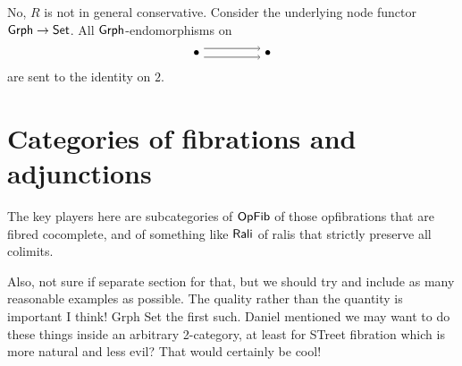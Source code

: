 \documentclass{amsart}
\begin{document}
\begin{ex}
  No, $ R $ is not in general conservative.
  Consider the underlying node functor
  $ \mathsf{Grph} \to \mathsf{Set} $.  All $ \mathsf{Grph} $-endomorphisms
  on
  \[
    \begin{tikzpicture}
      \node (a) at (0,0) {$ \bullet $};
      \node (b) at (2,0) {$ \bullet $};
      \draw [->] (a.30) to (b.150);
      \draw [->] (a.-30) to (b.-150);
    \end{tikzpicture}
  \]
  are sent to the identity on $ 2 $.
\end{ex}

\section{Categories of fibrations and adjunctions}

The key players here are subcategories of $\mathsf{OpFib}$ of those opfibrations that are fibred cocomplete, and of something like
$\mathsf{Rali}$ of ralis that strictly preserve all colimits.

{\chris Also, not sure if separate section for that, but we should try and include as many reasonable examples as possible. The quality rather
than the quantity is important I think! Grph Set the first such.}
{\chris Daniel mentioned we may want to do these things inside an arbitrary 2-category, at least for STreet fibration which is more natural and less evil? That would certainly be cool!}



\end{document}
